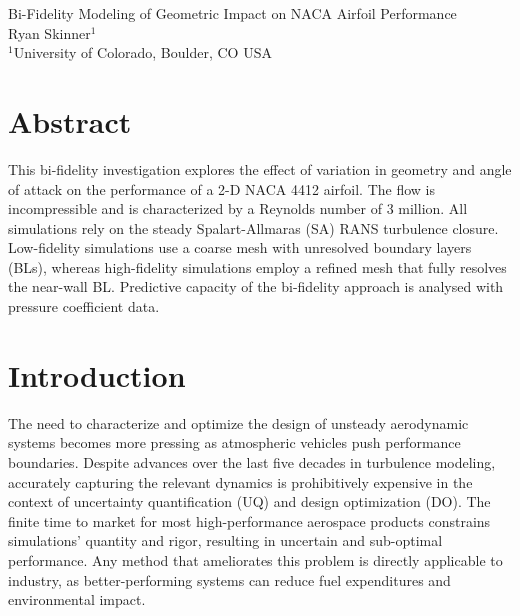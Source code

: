 \documentclass[11pt]{article}
\begin{document}
{
	\fancyhf[LH]{}
	\fancyhf[CH]{}
	\fancyhf[RH]{\thepage}
	\fancyhf[LF]{}
	\fancyhf[CF]{}
	\fancyhf[RF]{}
}

{
	\fancyhf[CH]{}
	\fancyhf[LF]{}
	\fancyhf[CF]{}
	\fancyhf[RF]{}
}

\pagestyle{allpages}
\thispagestyle{firstpage}
\renewcommand{\sectionmark}[1]{ \markright{#1}{} }

\vspace*{0in}
\begin{center}
\Large
Bi-Fidelity Modeling of Geometric Impact on NACA Airfoil Performance
\\[1ex]
\large
Ryan Skinner$^1$
\\[1ex]
\normalsize
$^1$University of Colorado, Boulder, CO USA
\end{center}
\vspace*{0.3in}

\section*{Abstract}
This bi-fidelity investigation explores the effect of variation in geometry and angle of attack on the performance of a 2-D NACA 4412 airfoil. The flow is incompressible and is characterized by a Reynolds number of 3 million. All simulations rely on the steady Spalart-Allmaras (SA) RANS turbulence closure. Low-fidelity simulations use a coarse mesh with unresolved boundary layers (BLs), whereas high-fidelity simulations employ a refined mesh that fully resolves the near-wall BL. Predictive capacity of the bi-fidelity approach is analysed with pressure coefficient data.

\section{Introduction}

The need to characterize and optimize the design of unsteady aerodynamic systems becomes more pressing as atmospheric vehicles push performance boundaries. Despite advances over the last five decades in turbulence modeling, accurately capturing the relevant dynamics is prohibitively expensive in the context of uncertainty quantification (UQ) and design optimization (DO). The finite time to market for most high-performance aerospace products constrains simulations' quantity and rigor, resulting in uncertain and sub-optimal performance. Any method that ameliorates this problem is directly applicable to industry, as better-performing systems can reduce fuel expenditures and environmental impact.
\end{document}

